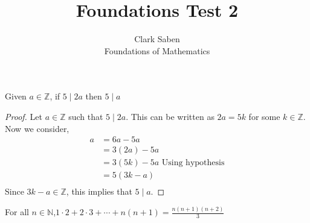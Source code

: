 \documentclass[12pt]{article}
\newenvironment{theorem}[2][Theorem]{\begin{trivlist}
\item[\hskip \labelsep {\bfseries #1}\hskip \labelsep {\bfseries #2.}]}{\end{trivlist}}
\begin{document}
 
 
\title{Foundations Test 2}%
\author{Clark Saben\\ %
Foundations of Mathematics} %
 
\maketitle

\section{}
\begin{theorem}1
	Given $a \in \mathbb{Z}$, if $5\mid2a$ then $5\mid a$
\end{theorem}
\begin{proof}
	Let $a \in \mathbb{Z}$ such that $5\mid2a$. This can be written as
	$2a = 5k$ for some $k \in \mathbb{Z}$. Now we consider,
	\begin{align*}
		a &=6a-5a\\
		  &=3(2a)-5a\\
		  &=3(5k)-5a \text{ Using hypothesis}\\
		  &=5(3k-a)\\
	\end{align*}
	Since $3k-a \in \mathbb{Z}$, this implies that $5\mid a$.

\end{proof}
\begin{theorem}{3}
	For all $n \in \mathbb{N}$,$ 1\cdot2 + 2\cdot3 + \cdots + n(n+1) = \frac{n(n+1)(n+2)}{3}$
\end{theorem}
\end{document}
